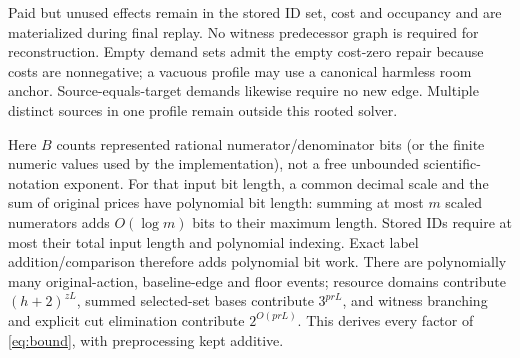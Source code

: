 Paid but unused effects remain in the stored ID set, cost and occupancy and are
materialized during final replay. No witness predecessor graph is required for
reconstruction. Empty demand sets admit the empty cost-zero repair because costs
are nonnegative; a vacuous profile may use a canonical harmless room anchor.
Source-equals-target demands likewise require no new edge. Multiple distinct
sources in one profile remain outside this rooted solver.

Here $B$ counts represented rational numerator/denominator bits (or the finite numeric values used by the implementation), not a free unbounded scientific-notation exponent. For that input bit length, a common decimal scale and the sum of original prices
have polynomial bit length: summing at most $m$ scaled numerators adds
$O(\log m)$ bits to their maximum length. Stored IDs require at most their total
input length and polynomial indexing. Exact label addition/comparison therefore
adds polynomial bit work. There are polynomially many original-action,
baseline-edge and floor events; resource domains contribute $(h+2)^{zL}$,
summed selected-set bases contribute $3^{prL}$, and witness branching and explicit
cut elimination contribute $2^{O(prL)}$. This derives every factor of
\eqref{eq:bound}, with preprocessing kept additive.


